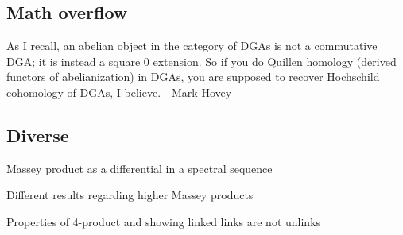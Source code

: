 \subsection{Math overflow}

As I recall, an abelian object in the category of DGAs is not a commutative DGA; it is instead a square 0 extension. So if you do Quillen homology (derived functors of abelianization) in DGAs, you are supposed to recover Hochschild cohomology of DGAs, I believe. - Mark Hovey

\subsection{Diverse}



Massey product as a differential in a spectral sequence 

Different results regarding higher Massey products

Properties of 4-product and showing linked links are not unlinks












